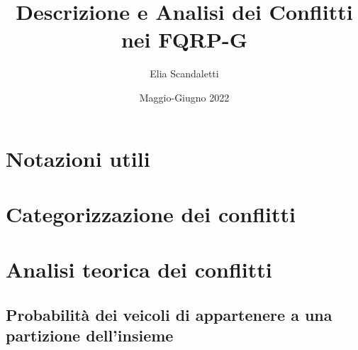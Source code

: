 \documentclass{article}
\title{Descrizione e Analisi dei Conflitti nei FQRP-G}
\author{Elia Scandaletti}
\date{Maggio-Giugno 2022}
\begin{document}
\maketitle

\tableofcontents

\section{Notazioni utili}


\section{Categorizzazione dei conflitti}


\section{Analisi teorica dei conflitti}
\subsection{Probabilità dei veicoli di appartenere a una partizione dell'insieme}

% 
\end{document}
